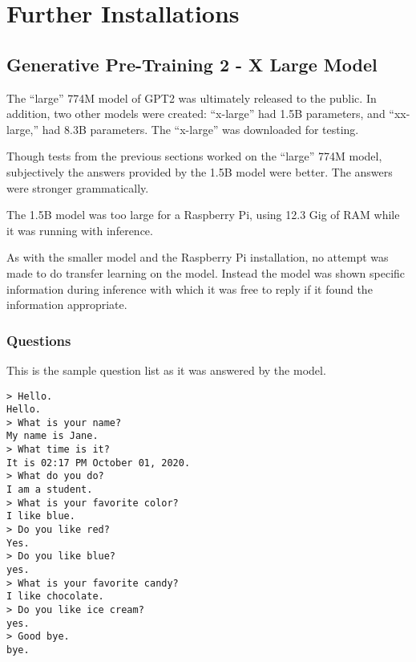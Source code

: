 \chapter{Further Installations}

\section{Generative Pre-Training 2 - X Large Model}

The ``large'' 774M model of GPT2 was ultimately released to the public. In addition, two other models were created: ``x-large'' had 1.5B parameters, and ``xx-large,'' had 8.3B parameters. The ``x-large'' was downloaded for testing.

Though tests from the previous sections worked on the ``large'' 774M model, subjectively the answers provided by the 1.5B model were better. The answers were stronger grammatically.

The 1.5B model was too large for a Raspberry Pi, using 12.3 Gig of RAM while it was running with inference. %

As with the smaller model and the Raspberry Pi installation, no attempt was made to do transfer learning on the model. Instead the model was shown specific information during inference with which it was free to reply if it found the information appropriate.


\label{chapter-gpt2-xl-intro}

\subsection{Questions}

This is the sample question list as it was answered by the model.

\begin{verbatim}
> Hello.
Hello. 
> What is your name? 
My name is Jane.  
> What time is it?
It is 02:17 PM October 01, 2020. 
> What do you do? 
I am a student. 
> What is your favorite color? 
I like blue. 
> Do you like red?
Yes. 
> Do you like blue? 
yes. 
> What is your favorite candy? 
I like chocolate. 
> Do you like ice cream?
yes. 
> Good bye.
bye. 
\end{verbatim}

